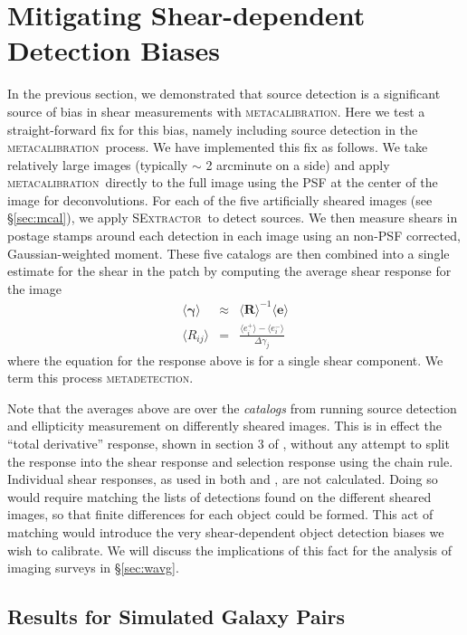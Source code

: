 \documentclass[fleqn,useAMS,usenatbib]{mnras}
\newcommand{\mcal}{\textsc{metacalibration}}
\newcommand{\mdet}{\textsc{metadetection}}
\newcommand{\sx}{\textsc{SExtractor}}
\begin{document}
\section{Mitigating Shear-dependent Detection Biases}
\label{sec:mitigate}

In the previous section, we demonstrated that source detection is a significant
source of bias in shear measurements with \mcal. Here we test a
straight-forward fix for this bias, namely including source detection in the
\mcal\ process. We have implemented this fix as follows. We take relatively
large images (typically $\sim$ 2 arcminute on a side) and apply \mcal\ directly
to the full image using the PSF at the center of the image for deconvolutions.
For each of the five artificially sheared images (see \S \ref{sec:mcal}), we
apply \sx\ to detect sources. We then measure shears in postage stamps around
each detection in each image using an non-PSF corrected, Gaussian-weighted
moment.  These five catalogs are then combined into a single estimate for the
shear in the patch by computing the average shear response for the image
\begin{eqnarray}
\langle \boldsymbol\gamma \rangle &\approx& \langle \boldsymbol{R}\rangle^{-1}\langle\boldsymbol{e}\rangle\\
\langle R_{ij}\rangle &=& \frac{\langle e_i^{+}\rangle - \langle e_i^{-}\rangle}{\Delta\gamma_j}
\end{eqnarray}
where the equation for the response above is for a single shear component. We term this
process \mdet.

Note that the averages above are over the {\it catalogs} from running source
detection and ellipticity measurement on differently sheared images. This is in
effect the ``total derivative'' response, shown in section 3 of
\cite{SheldonMcal2017}, without any attempt to split the response into the
shear response and selection response using the chain rule.  Individual shear
responses, as used in both \cite{SheldonMcal2017} and \cite{HuffMcal2017}, are
not calculated.  Doing so would require matching the lists of detections found
on the different sheared images, so that finite differences for each object
could be formed.  This act of matching would introduce the very shear-dependent
object detection biases we wish to calibrate.  We will discuss the implications
of this fact for the analysis of imaging surveys in \S \ref{sec:wavg}.

\subsection{Results for Simulated Galaxy Pairs}
\label{sec:mdetpairs}
\end{document}

